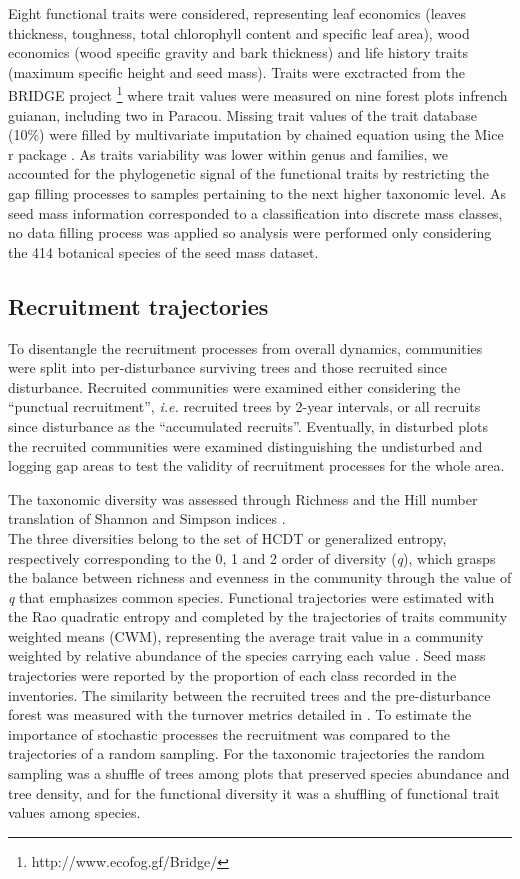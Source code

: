\documentclass[fleqn,10pt]{ArtEcoFoG} %
\begin{document}
Eight functional traits were considered, representing leaf economics
(leaves thickness, toughness, total chlorophyll content and specific
leaf area), wood economics (wood specific gravity and bark thickness)
and life history traits (maximum specific height and seed mass). Traits
were exctracted from the BRIDGE project \footnote{http://www.ecofog.gf/Bridge/}
where trait values were measured on nine forest plots infrench guianan,
including two in Paracou. Missing trait values of the trait database
(10\%) were filled by multivariate imputation by chained equation using
the Mice r package \citep{Mice2011}. As traits variability was lower
within genus and families, we accounted for the phylogenetic signal of
the functional traits by restricting the gap filling processes to
samples pertaining to the next higher taxonomic level. As seed mass
information corresponded to a classification into discrete mass classes,
no data filling process was applied so analysis were performed only
considering the 414 botanical species of the seed mass dataset.

\subsection{Recruitment trajectories}\label{recruitment-trajectories}

To disentangle the recruitment processes from overall dynamics,
communities were split into per-disturbance surviving trees and those
recruited since disturbance. Recruited communities were examined either
considering the ``punctual recruitment'', \emph{i.e.} recruited trees by
2-year intervals, or all recruits since disturbance as the ``accumulated
recruits''. Eventually, in disturbed plots the recruited communities
were examined distinguishing the undisturbed and logging gap areas to
test the validity of recruitment processes for the whole area.

The taxonomic diversity was assessed through Richness and the Hill
number translation of Shannon and Simpson indices
\citep{Hill1973, chao2015estimating, Marcon2015b}.\\
The three diversities belong to the set of HCDT or generalized entropy,
respectively corresponding to the 0, 1 and 2 order of diversity
(\emph{q}), which grasps the balance between richness and evenness in
the community through the value of \emph{q} that emphasizes common
species. Functional trajectories were estimated with the Rao quadratic
entropy and completed by the trajectories of traits community weighted
means (CWM), representing the average trait value in a community
weighted by relative abundance of the species carrying each value
\citep{Diaz2007, Garnier2004}. Seed mass trajectories were reported by
the proportion of each class recorded in the inventories. The similarity
between the recruited trees and the pre-disturbance forest was measured
with the turnover metrics detailed in \citet{Podani2013a}. To estimate
the importance of stochastic processes the recruitment was compared to
the trajectories of a random sampling. For the taxonomic trajectories
the random sampling was a shuffle of trees among plots that preserved
species abundance and tree density, and for the functional diversity it
was a shuffling of functional trait values among species.
\end{document}
